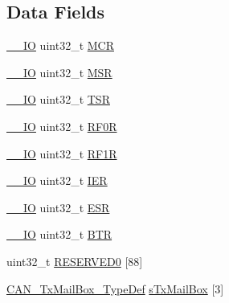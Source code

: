 \subsection*{Data Fields}
\begin{DoxyCompactItemize}
\item 
\hyperlink{group___c_m_s_i_s__core__definitions_gaec43007d9998a0a0e01faede4133d6be}{\+\_\+\+\_\+\+IO} uint32\+\_\+t \hyperlink{struct_c_a_n___type_def_a27af4e9f888f0b7b1e8da7e002d98798}{M\+CR}
\item 
\hyperlink{group___c_m_s_i_s__core__definitions_gaec43007d9998a0a0e01faede4133d6be}{\+\_\+\+\_\+\+IO} uint32\+\_\+t \hyperlink{struct_c_a_n___type_def_acdd4c1b5466be103fb2bb2a225b1d3a9}{M\+SR}
\item 
\hyperlink{group___c_m_s_i_s__core__definitions_gaec43007d9998a0a0e01faede4133d6be}{\+\_\+\+\_\+\+IO} uint32\+\_\+t \hyperlink{struct_c_a_n___type_def_a87e3001757a0cd493785f1f3337dd0e8}{T\+SR}
\item 
\hyperlink{group___c_m_s_i_s__core__definitions_gaec43007d9998a0a0e01faede4133d6be}{\+\_\+\+\_\+\+IO} uint32\+\_\+t \hyperlink{struct_c_a_n___type_def_accf4141cee239380d0ad4634ee21dbf6}{R\+F0R}
\item 
\hyperlink{group___c_m_s_i_s__core__definitions_gaec43007d9998a0a0e01faede4133d6be}{\+\_\+\+\_\+\+IO} uint32\+\_\+t \hyperlink{struct_c_a_n___type_def_a02b589bb589df4f39e549dca4d5abb08}{R\+F1R}
\item 
\hyperlink{group___c_m_s_i_s__core__definitions_gaec43007d9998a0a0e01faede4133d6be}{\+\_\+\+\_\+\+IO} uint32\+\_\+t \hyperlink{struct_c_a_n___type_def_a6566f8cfbd1d8aa7e8db046aa35e77db}{I\+ER}
\item 
\hyperlink{group___c_m_s_i_s__core__definitions_gaec43007d9998a0a0e01faede4133d6be}{\+\_\+\+\_\+\+IO} uint32\+\_\+t \hyperlink{struct_c_a_n___type_def_a2b39f943954e0e7d177b511d9074a0b7}{E\+SR}
\item 
\hyperlink{group___c_m_s_i_s__core__definitions_gaec43007d9998a0a0e01faede4133d6be}{\+\_\+\+\_\+\+IO} uint32\+\_\+t \hyperlink{struct_c_a_n___type_def_a5c0fcd3e7b4c59ab1dd68f6bd8f74e07}{B\+TR}
\item 
uint32\+\_\+t \hyperlink{struct_c_a_n___type_def_aae28ab86a4ae57ed057ed1ea89a6d34b}{R\+E\+S\+E\+R\+V\+E\+D0} \mbox{[}88\mbox{]}
\item 
\hyperlink{struct_c_a_n___tx_mail_box___type_def}{C\+A\+N\+\_\+\+Tx\+Mail\+Box\+\_\+\+Type\+Def} \hyperlink{struct_c_a_n___type_def_ae37503ab1a7bbd29846f94cdadf0a9ef}{s\+Tx\+Mail\+Box} \mbox{[}3\mbox{]}

\end{DoxyCompactItemize}
